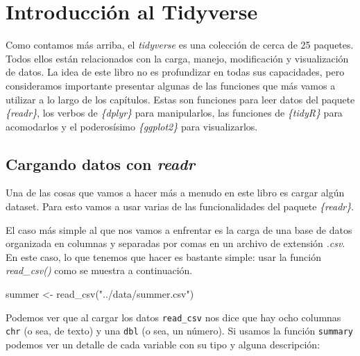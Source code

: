 \documentclass[
  letterpaper,
  DIV=11,
  numbers=noendperiod,
  oneside]{scrreprt}
\newenvironment{Shaded}{\begin{snugshade}}{\end{snugshade}}
\newcommand{\FunctionTok}[1]{\textcolor[rgb]{0.28,0.35,0.67}{#1}}
\newcommand{\NormalTok}[1]{\textcolor[rgb]{0.00,0.23,0.31}{#1}}
\newcommand{\OtherTok}[1]{\textcolor[rgb]{0.00,0.23,0.31}{#1}}
\newcommand{\StringTok}[1]{\textcolor[rgb]{0.13,0.47,0.30}{#1}}
\begin{document}
\hypertarget{introducciuxf3n-al-tidyverse}{%
\section{Introducción al Tidyverse}\label{introducciuxf3n-al-tidyverse}}

Como contamos más arriba, el \emph{tidyverse} es una colección de cerca
de 25 paquetes. Todos ellos están relacionados con la carga, manejo,
modificación y visualización de datos. La idea de este libro no es
profundizar en todas sus capacidades, pero consideramos importante
presentar algunas de las funciones que más vamos a utilizar a lo largo
de los capítulos. Estas son funciones para leer datos del paquete
\emph{\{readr\}}, los verbos de \emph{\{dplyr\}} para manipularlos, las
funciones de \emph{\{tidyR\}} para acomodarlos y el poderosísimo
\emph{\{ggplot2\}} para visualizarlos.

\hypertarget{cargando-datos-con-readr}{%
\subsection{\texorpdfstring{Cargando datos con
\emph{readr}}{Cargando datos con readr}}\label{cargando-datos-con-readr}}

Una de las cosas que vamos a hacer más a menudo en este libro es cargar
algún dataset. Para esto vamos a usar varias de las funcionalidades del
paquete \emph{\{readr\}}.

El caso más simple al que nos vamos a enfrentar es la carga de una base
de datos organizada en columnas y separadas por comas en un archivo de
extensión \emph{.csv}. En este caso, lo que tenemos que hacer es
bastante simple: usar la función \emph{read\_csv()} como se muestra a
continuación.

\begin{Shaded}
\begin{Highlighting}[]
\NormalTok{summer }\OtherTok{\textless{}{-}} \FunctionTok{read\_csv}\NormalTok{(}\StringTok{"../data/summer.csv"}\NormalTok{)}
\end{Highlighting}
\end{Shaded}

Podemos ver que al cargar los datos \texttt{read\_csv} nos dice que hay
ocho columnas \texttt{chr} (o sea, de texto) y una \texttt{dbl} (o sea,
un número). Si usamos la función \texttt{summary} podemos ver un detalle
de cada variable con su tipo y alguna descripción:
\end{document}
